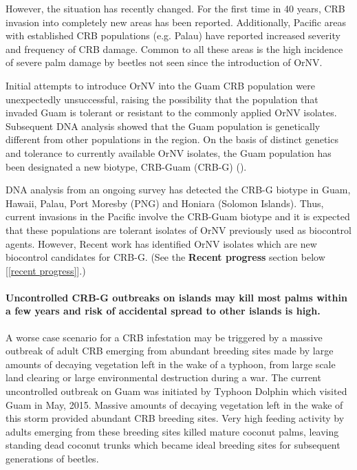 \documentclass[12pt,letterpaper,english,bibliography=totocnumbered, abstract=on]{scrartcl}
\begin{document}
However, the situation has recently changed. For the first time in
40 years, CRB invasion into completely new areas has been reported.
Additionally, Pacific areas with established CRB populations (e.g.
Palau) have reported increased severity and frequency of CRB damage.
Common to all these areas is the high incidence of severe palm damage
by beetles not seen since the introduction of OrNV. 

Initial attempts to introduce OrNV into the Guam CRB population were
unexpectedly unsuccessful, raising the possibility that the population
that invaded Guam is tolerant or resistant to the commonly applied
OrNV isolates. Subsequent DNA analysis showed that the Guam population
is genetically different from other populations in the region. On
the basis of distinct genetics and tolerance to currently available
OrNV isolates, the Guam population has been designated a new biotype,
CRB-Guam (CRB-G) (\cite{marshall_new_2015,marshall_new_2017-1}).

DNA analysis from an ongoing survey has detected the CRB-G biotype
in Guam, Hawaii, Palau, Port Moresby (PNG) and Honiara (Solomon Islands).
Thus, current invasions in the Pacific involve the CRB-Guam biotype
and it is expected that these populations are tolerant
isolates of OrNV previously used as biocontrol agents. However, Recent work has identified OrNV isolates which are new biocontrol candidates for CRB-G. (See the \textbf{Recent progress} section below [\ref{recent progress}].)

\paragraph*{Uncontrolled CRB-G outbreaks on islands may kill most palms within a few
years and risk of accidental spread to other islands is high.}

A worse case scenario for a CRB infestation may be triggered by a massive outbreak of adult
CRB emerging from abundant breeding sites made by large amounts of
decaying vegetation left in the wake of a typhoon, from large scale land clearing or large environmental destruction during a war.  The current uncontrolled outbreak on Guam was initiated
by Typhoon Dolphin which visited Guam in May, 2015. Massive amounts of decaying vegetation left in the wake of this storm provided abundant CRB breeding sites. Very high feeding activity by adults emerging 
from these breeding sites killed mature coconut palms, leaving standing dead coconut trunks
which became ideal breeding sites for subsequent generations of beetles. 
\end{document}

